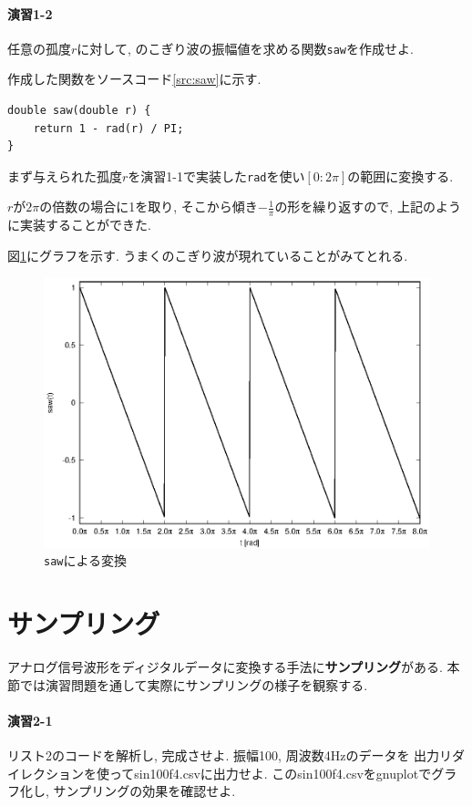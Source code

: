 \documentclass[titlepage]{jsarticle}
\begin{document}
    \paragraph{演習1-2} 任意の孤度$r$に対して, のこぎり波の振幅値を求める関数\verb|saw|を作成せよ.

        作成した関数をソースコード\ref{src:saw}に示す.

        \begin{lstlisting}[caption=saw.c, label=src:saw]
double saw(double r) {
    return 1 - rad(r) / PI;
}
        \end{lstlisting}

        まず与えられた孤度$r$を演習1-1で実装した\verb|rad|を使い$[0:2\pi]$の範囲に変換する.

        $r$が$2\pi$の倍数の場合に1を取り, そこから傾き$-\frac{1}{\pi}$の形を繰り返すので,
        上記のように実装することができた.

        図\ref{fig:saw}にグラフを示す. うまくのこぎり波が現れていることがみてとれる.

        \begin{figure}[ht]
            \centering
            \includegraphics[width=12cm]{images/saw.eps}
            \cprotect\caption{\verb|saw|による変換}
            \label{fig:saw}
        \end{figure}

\section{サンプリング}
    アナログ信号波形をディジタルデータに変換する手法に\textbf{サンプリング}がある.
    本節では演習問題を通して実際にサンプリングの様子を観察する.

    \paragraph{演習2-1} リスト2のコードを解析し, 完成させよ. 振幅100, 周波数4Hzのデータを
    出力リダイレクションを使ってsin100f4.csvに出力せよ. このsin100f4.csvをgnuplotでグラフ化し,
    サンプリングの効果を確認せよ.
\end{document}
